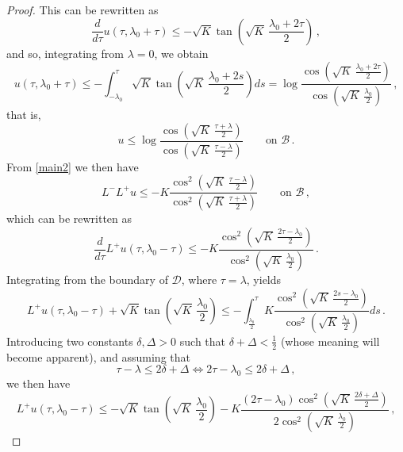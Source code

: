 \documentclass[10pt]{amsart}
\begin{document}
\begin{proof}
This can be rewritten as
\begin{equation} 
\frac{d}{d\tau} u(\tau, \lambda_0 + \tau) \leq - \sqrt{K} \tan \left( \sqrt{K} \, \frac{\lambda_0 + 2\tau}2 \right) \, ,
\end{equation}
and so, integrating from $\lambda=0$, we obtain
\begin{equation} 
u(\tau, \lambda_0 + \tau) \leq - \int_{-\lambda_0}^\tau \sqrt{K} \tan \left( \sqrt{K} \, \frac{\lambda_0 + 2s}2 \right) ds = \log \frac{\cos \left( \sqrt{K} \, \frac{\lambda_0 + 2\tau}2 \right)}{\cos \left( \sqrt{K} \, \frac{\lambda_0}2 \right)} \, ,
\end{equation}
that is,
\begin{equation} 
u \leq \log \frac{\cos \left( \sqrt{K} \, \frac{\tau + \lambda}2 \right)}{\cos \left( \sqrt{K} \, \frac{\tau - \lambda}2 \right)} \qquad \text{on } \mathcal{B} \, .
\end{equation}
From \eqref{main2} we then have
\begin{equation} 
L^- L^+ u \leq - K \frac{\cos^2 \left( \sqrt{K} \, \frac{\tau - \lambda}2 \right)}{\cos^2 \left( \sqrt{K} \, \frac{\tau + \lambda}2 \right)} \qquad \text{on } \mathcal{B} \, ,
\end{equation}
which can be rewritten as
\begin{equation} 
\frac{d}{d\tau} L^+u(\tau, \lambda_0 - \tau) \leq - K \frac{\cos^2 \left( \sqrt{K} \, \frac{2\tau - \lambda_0}2 \right)}{\cos^2 \left( \sqrt{K} \, \frac{\lambda_0}2 \right)} \, .
\end{equation}
Integrating from the boundary of $\mathcal{D}$, where $\tau = \lambda$, yields
\begin{equation} 
L^+u(\tau, \lambda_0 - \tau) + \sqrt{K} \tan \left( \sqrt{K} \, \frac{\lambda_0}2 \right) \leq - \int_{\frac{\lambda_0}2}^\tau K \frac{\cos^2 \left( \sqrt{K} \, \frac{2s - \lambda_0}2 \right)}{\cos^2 \left( \sqrt{K} \, \frac{\lambda_0}2 \right)} ds \, .
\end{equation}
Introducing two constants $\delta, \Delta > 0$ such that $\delta + \Delta < \frac12$ (whose meaning will become apparent), and assuming that
\begin{equation} 
\tau - \lambda \leq 2 \delta + \Delta \Leftrightarrow 2\tau - \lambda_0 \leq 2 \delta + \Delta \, ,
\end{equation}
we then have
\begin{equation} 
L^+u(\tau, \lambda_0 - \tau) \leq - \sqrt{K} \tan \left( \sqrt{K} \, \frac{\lambda_0}2 \right) - K \frac{(2\tau - \lambda_0)\cos^2 \left( \sqrt{K} \, \frac{2 \delta + \Delta}2 \right)}{2\cos^2 \left( \sqrt{K} \, \frac{\lambda_0}2 \right)} \, ,

\end{equation}
\end{proof}
\end{document}
